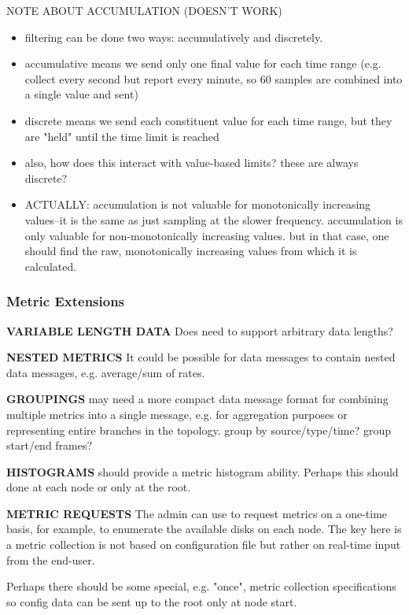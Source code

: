 NOTE ABOUT ACCUMULATION (DOESN'T WORK)

\begin{itemize}
\item filtering can be done two ways: accumulatively and discretely.
\item accumulative means we send only one final value for each time range (e.g. collect every second but report every
      minute, so 60 samples are combined into a single value and sent)
\item discrete means we send each constituent value for each time range, but they are "held" until the time limit is
      reached
\item also, how does this interact with value-based limits? these are always discrete?
\item ACTUALLY: accumulation is not valuable for monotonically increasing values--it is the same as just sampling at the
      slower frequency. accumulation is only valuable for non-monotonically increasing values. but in that case, one
      should find the raw, monotonically increasing values from which it is calculated.
\end{itemize}

\subsubsection{Metric Extensions}

\textbf{VARIABLE LENGTH DATA}
Does \dcamp need to support arbitrary data lengths?

\textbf{NESTED METRICS}
It could be possible for data messages to contain nested data messages, e.g. average/sum of rates.

\textbf{GROUPINGS}
\dcamp may need a more compact data message format for combining multiple metrics into a single message, e.g. for
aggregation purposes or representing entire branches in the topology.
group by source/type/time?
group start/end frames?

\textbf{HISTOGRAMS}
\dcamp should provide a metric histogram ability. Perhaps this should done at each node or only at the root.

\textbf{METRIC REQUESTS}
The admin can use \dcamp to request metrics on a one-time basis, for example, to enumerate the available disks on each
node. The key here is a metric collection is not based on configuration file but rather on real-time input from the
end-user.

Perhaps there should be some special, e.g. "once", metric collection specifications so config data can be sent up to the
root only at node start.

